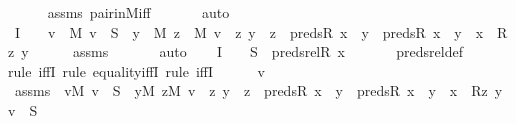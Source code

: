 \begin{isabellebody}
\ \ \ \ \isamarkupfalse%
\ assms\ pair{\isacharunderscore}{\kern0pt}in{\isacharunderscore}{\kern0pt}M{\isacharunderscore}{\kern0pt}iff\ \isanewline
\ \ \ \ \isamarkupfalse%
\ auto\isanewline
\ \ \isamarkupfalse%
\ I{}\ {\isacharcolon}{\kern0pt}\ {\isachardoublequoteopen}{\isachardot}{\kern0pt}{\isachardot}{\kern0pt}{\isachardot}{\kern0pt}\ {\isasymlongleftrightarrow}\ {\isacharparenleft}{\kern0pt}{\isasymforall}v\ {\isasymin}\ M{\isachardot}{\kern0pt}\ v\ {\isasymin}\ S\ {\isasymlongleftrightarrow}\ {\isacharparenleft}{\kern0pt}{\isasymexists}y\ {\isasymin}\ M{\isachardot}{\kern0pt}\ {\isasymexists}z\ {\isasymin}\ M{\isachardot}{\kern0pt}\ v\ {\isacharequal}{\kern0pt}\ {\isacharless}{\kern0pt}z{\isacharcomma}{\kern0pt}\ y{\isachargreater}{\kern0pt}\ {\isasymand}\ z\ {\isasymin}\ preds{\isacharparenleft}{\kern0pt}R{\isacharcomma}{\kern0pt}\ x{\isacharparenright}{\kern0pt}\ {\isasymand}\ {\isacharparenleft}{\kern0pt}y\ {\isasymin}\ preds{\isacharparenleft}{\kern0pt}R{\isacharcomma}{\kern0pt}\ x{\isacharparenright}{\kern0pt}\ {\isasymor}\ y\ {\isacharequal}{\kern0pt}\ x{\isacharparenright}{\kern0pt}\ {\isasymand}\ R{\isacharparenleft}{\kern0pt}z{\isacharcomma}{\kern0pt}\ y{\isacharparenright}{\kern0pt}{\isacharparenright}{\kern0pt}{\isacharparenright}{\kern0pt}{\isachardoublequoteclose}\isanewline
\ \ \ \ \isamarkupfalse%
\ assms\ \isanewline
\ \ \ \ \isamarkupfalse%
\ auto\isanewline
\ \ \isamarkupfalse%
\ I{}\ {\isacharcolon}{\kern0pt}\ {\isachardoublequoteopen}{\isachardot}{\kern0pt}{\isachardot}{\kern0pt}{\isachardot}{\kern0pt}\ {\isasymlongleftrightarrow}\ S\ {\isacharequal}{\kern0pt}\ preds{\isacharunderscore}{\kern0pt}rel{\isacharparenleft}{\kern0pt}R{\isacharcomma}{\kern0pt}\ x{\isacharparenright}{\kern0pt}{\isachardoublequoteclose}\ \isanewline
\ \ \ \ \isamarkupfalse%
\ preds{\isacharunderscore}{\kern0pt}rel{\isacharunderscore}{\kern0pt}def\isanewline
\ \ \isamarkupfalse%
{\isacharparenleft}{\kern0pt}rule\ iffI{\isacharcomma}{\kern0pt}\ rule\ equality{\isacharunderscore}{\kern0pt}iffI{\isacharcomma}{\kern0pt}\ rule\ iffI{\isacharparenright}{\kern0pt}\isanewline
\ \ \ \ \isamarkupfalse%
\ v\ \isamarkupfalse%
\ assms{}\ {\isacharcolon}{\kern0pt}\ {\isachardoublequoteopen}{\isasymforall}v{\isasymin}M{\isachardot}{\kern0pt}\ v\ {\isasymin}\ S\ {\isasymlongleftrightarrow}\ {\isacharparenleft}{\kern0pt}{\isasymexists}y{\isasymin}M{\isachardot}{\kern0pt}\ {\isasymexists}z{\isasymin}M{\isachardot}{\kern0pt}\ v\ {\isacharequal}{\kern0pt}\ {\isasymlangle}z{\isacharcomma}{\kern0pt}\ y{\isasymrangle}\ {\isasymand}\ z\ {\isasymin}\ preds{\isacharparenleft}{\kern0pt}R{\isacharcomma}{\kern0pt}\ x{\isacharparenright}{\kern0pt}\ {\isasymand}\ {\isacharparenleft}{\kern0pt}y\ {\isasymin}\ preds{\isacharparenleft}{\kern0pt}R{\isacharcomma}{\kern0pt}\ x{\isacharparenright}{\kern0pt}\ {\isasymor}\ y\ {\isacharequal}{\kern0pt}\ x{\isacharparenright}{\kern0pt}\ {\isasymand}\ R{\isacharparenleft}{\kern0pt}z{\isacharcomma}{\kern0pt}\ y{\isacharparenright}{\kern0pt}{\isacharparenright}{\kern0pt}{\isachardoublequoteclose}\ {\isachardoublequoteopen}v\ {\isasymin}\ S{\isachardoublequoteclose}\ \isanewline

\end{isabellebody}
